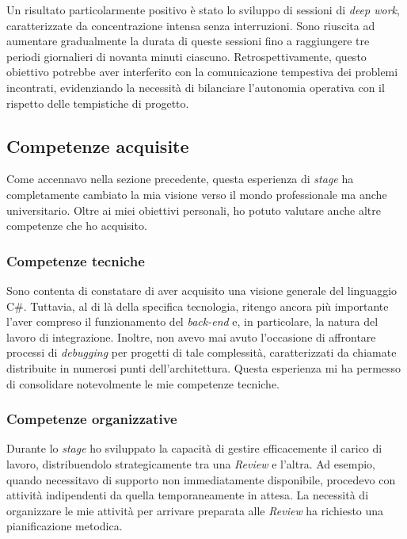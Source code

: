         \vspace{0.2 em}
        \noindent Un risultato particolarmente positivo è stato lo sviluppo di sessioni di \textit{deep work}, caratterizzate da concentrazione intensa senza interruzioni. Sono riuscita ad aumentare gradualmente la durata di queste sessioni fino a raggiungere tre periodi giornalieri di novanta minuti ciascuno. Retrospettivamente, questo obiettivo potrebbe aver interferito con la comunicazione tempestiva dei problemi incontrati, evidenziando la necessità di bilanciare l'autonomia operativa con il rispetto delle tempistiche di progetto.
        
    \subsection{Competenze acquisite}
    Come accennavo nella sezione precedente, questa esperienza di \textit{stage} ha completamente cambiato la mia visione verso il mondo professionale ma anche universitario. Oltre ai miei obiettivi personali, ho potuto valutare anche altre competenze che ho acquisito. 

    \subsubsection{Competenze tecniche}
    Sono contenta di constatare di aver acquisito una visione generale del linguaggio C\#. Tuttavia, al di là della specifica tecnologia, ritengo ancora più importante l'aver compreso il funzionamento del \textit{back-end} e, in particolare, la natura del lavoro di integrazione. Inoltre, non avevo mai avuto l'occasione di affrontare processi di \textit{debugging} per progetti di tale complessità, caratterizzati da chiamate distribuite in numerosi punti dell'architettura. Questa esperienza mi ha permesso di consolidare notevolmente le mie competenze tecniche.

    \subsubsection{Competenze organizzative}
    Durante lo \textit{stage} ho sviluppato la capacità di gestire efficacemente il carico di lavoro, distribuendolo strategicamente tra una \textit{Review} e l'altra. Ad esempio, quando necessitavo di supporto non immediatamente disponibile, procedevo con attività indipendenti da quella temporaneamente in attesa. La necessità di organizzare le mie attività per arrivare preparata alle \textit{Review} ha richiesto una pianificazione metodica. 
    
